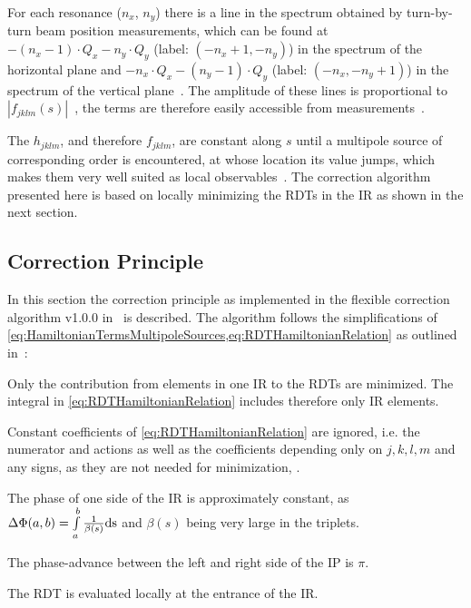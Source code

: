For each resonance ($n_x$, $n_y$) there is a line in the spectrum obtained by turn-by-turn beam position measurements,
which can be found at $-(n_x-1) \cdot Q_x - n_y \cdot Q_y$ (label: $(-n_x+1, -n_y)$)   in the spectrum of the horizontal plane 
and $-n_x \cdot Q_x - (n_y - 1) \cdot Q_y$ (label: $(-n_x, -n_y+1)$) in the spectrum of the vertical plane~\cite{FranchiStudiesMeasurementsLinear2006}.
The amplitude of these lines is proportional to $\left| f_{jklm} (s) \right|$~\cite{FranchiStudiesMeasurementsLinear2006},
the terms are therefore easily accessible from measurements~\cite{SchmidtMeasurementDrivingTerms2001,TomasDirectMeasurementResonance2003,TomasMeasurementGlobalLocal2005,FranchiFirstSimultaneousMeasurement2014,CarlierObservationsResonanceDriving2016}.

The $h_{jklm}$, and therefore $f_{jklm}$, are constant along $s$ until a multipole source of corresponding order is encountered,
at whose location its value jumps, which makes them very well suited as local observables~\cite{TomasMeasurementGlobalLocal2005}.
The correction algorithm presented here is based on locally minimizing the RDTs in the IR as shown in the next section. 

\subsection{Correction Principle}
\label{sec:CorrectionPrinciple}
 
In this section the correction principle as implemented in
the flexible correction algorithm v1.0.0 in~\cite{OMC-TeamIRNLRDTCorrection} is described.
The algorithm follows the simplifications of \cref{eq:HamiltonianTermsMultipoleSources,eq:RDTHamiltonianRelation} 
as outlined in~\cite{BruningDynamicApertureStudies2004}:

\begin{mytemize}
    \item Only the contribution from elements in one IR to the RDTs are minimized.
          The integral in \cref{eq:RDTHamiltonianRelation} includes therefore only IR elements.
    \item Constant coefficients of \cref{eq:RDTHamiltonianRelation} are ignored, 
          i.e. the numerator and actions as well as the coefficients depending only on $j,k,l,m$ and any signs,
          as they are not needed for minimization, .
    \item The phase of one side of the IR is approximately constant, as \\
          $\Delta \Phi(a,b) = \int\limits_a^b \frac{1}{\beta(s)} \rm{d}s$  
          and $\beta(s)$ being very large in the triplets. 
    \item The phase-advance between the left and right side of the IP is $\pi$. 
    \item The RDT is evaluated locally at the entrance of the IR. 
\end{mytemize}

